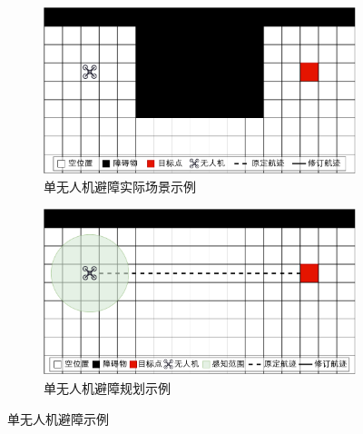 \begin{figure}[!htbp]
    \centering
    \begin{subfigure}[t]{0.48\textwidth}
        \captionsetup{justification=centering}
        \begin{minipage}[b]{\linewidth}
            \includegraphics[width=\textwidth]{images/单无人机避障实际场景示例.pdf}
            \caption{单无人机避障实际场景示例}
            \label{fig:单无人机避障实际场景示例}
        \end{minipage}
    \end{subfigure}
    \begin{subfigure}[t]{0.48\textwidth}
        \captionsetup{justification=centering}
        \begin{minipage}[b]{\linewidth}
            \includegraphics[width=\textwidth]{images/单无人机避障规划场景示例.pdf}
            \caption{单无人机避障规划示例}
            \label{fig:单无人机避障规划示例}
        \end{minipage}
    \end{subfigure}
    \caption{单无人机避障示例}
    \label{fig:单无人机避障示例}
\end{figure}


